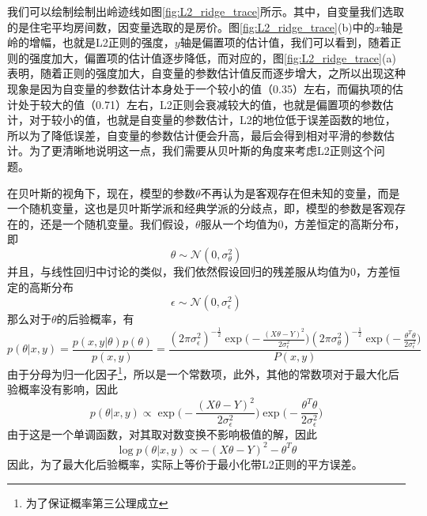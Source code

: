 

我们可以绘制绘制出岭迹线如图\ref{fig:L2_ridge_trace}所示。其中，自变量我们选取的是住宅平均房间数，因变量选取的是房价。图\ref{fig:L2_ridge_trace}(b)中的$x$轴是岭的增幅，也就是L2正则的强度，$y$轴是偏置项的估计值，我们可以看到，随着正则的强度加大，偏置项的估计值逐步降低，而对应的，图\ref{fig:L2_ridge_trace}(a)表明，随着正则的强度加大，自变量的参数估计值反而逐步增大，之所以出现这种现象是因为自变量的参数估计本身处于一个较小的值（0.35）左右，而偏执项的估计处于较大的值（0.71）左右，L2正则会衰减较大的值，也就是偏置项的参数估计，对于较小的值，也就是自变量的参数估计，L2的地位低于误差函数的地位，所以为了降低误差，自变量的参数估计便会升高，最后会得到相对平滑的参数估计。为了更清晰地说明这一点，我们需要从贝叶斯的角度来考虑L2正则这个问题。

在贝叶斯的视角下，现在，模型的参数$\theta$不再认为是客观存在但未知的变量，而是一个随机变量，这也是贝叶斯学派和经典学派的分歧点，即，模型的参数是客观存在的，还是一个随机变量。我们假设，$\theta$服从一个均值为0，方差恒定的高斯分布，即
\begin{equation}
	\theta \sim \mathcal{N}(0, \sigma_\theta^2)
\end{equation}
并且，与线性回归中讨论的类似，我们依然假设回归的残差服从均值为0，方差恒定的高斯分布
\begin{equation}
	\epsilon \sim \mathcal{N}(0, \sigma_\epsilon^2)
\end{equation}
那么对于$\theta$的后验概率，有
\begin{equation}
	p(\theta|x, y) = \frac{p(x, y| \theta)p(\theta)}{p(x, y)} 
	= \frac{(2\pi\sigma_\epsilon^2)^{-\frac{1}{2}}\exp\Big(-\frac{(X\theta - Y)^2}{2\sigma_\epsilon^2}\Big)
	(2\pi\sigma_\theta^2)^{-\frac{1}{2}}\exp\Big(-\frac{\theta^T\theta}{2\sigma_\epsilon^2}\Big)
	}{P(x, y)}
\end{equation}
由于分母为归一化因子\footnote{为了保证概率第三公理成立}，所以是一个常数项，此外，其他的常数项对于最大化后验概率没有影响，因此
\begin{equation}
	p(\theta|x, y) \propto
	\exp\Big(-\frac{(X\theta - Y)^2}{2\sigma_\epsilon^2}\Big)
	\exp\Big(-\frac{\theta^T\theta}{2\sigma_\epsilon^2}\Big)
\end{equation}
由于这是一个单调函数，对其取对数变换不影响极值的解，因此
\begin{equation}
	\log p(\theta|x, y) \propto
	-(X\theta - Y)^2
	-\theta^T\theta
\end{equation}
因此，为了最大化后验概率，实际上等价于最小化带L2正则的平方误差。

